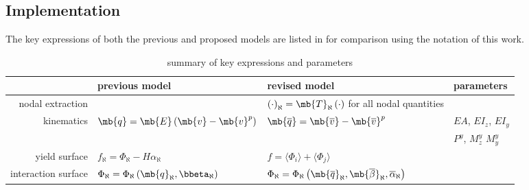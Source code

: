 \subsection{Implementation}
The key expressions of both the previous and proposed models are listed in  for comparison using the notation of this work.
\begin{table}[H]
\centering\footnotesize\renewcommand{\arraystretch}{2}
\caption{summary of key expressions and parameters}\label{tab:nm_key_eq}
\begin{tabular}{r|l|l|l}
    \toprule
                        & previous model \cite{Kostic2013}                                                & revised model                                                                                                                                               & parameters             \\ \midrule
       nodal extraction &                                                                                  & $\left(\cdot\right)_\aleph=\mb{T}_\aleph\left(\cdot\right)$ for all nodal quantities                                                                        &                        \\
             kinematics & $\mb{q}=\mb{E}\left(\mb{v}-\mb{v}^p\right)$                                      & $\mb{\overline{q}}=\mb{\overline{v}}-\mb{\overline{v}}^p$                                                                                                   & $EA$, $EI_z$, $EI_y$   \\
                        &                                                                                  &                                                                                                                                                             & $P^y$, $M^y_z$ $M^y_y$ \\
          yield surface & $f_\aleph=\Phi_\aleph-H\alpha_\aleph$                                            & $f=\langle\Phi_i\rangle+\langle\Phi_j\rangle$                                                                                                               &                        \\
    interaction surface & $\Phi_\aleph=\Phi_\aleph\left(\mb{q}_\aleph,\bbeta_\aleph\right)$                & $\Phi_\aleph=\Phi_\aleph\left(\mb{\overline{q}}_\aleph,\mb{\overline{\beta}}_\aleph,\overline{\alpha}_\aleph\right)$                                        &                        \\

\end{tabular}
\end{table}
